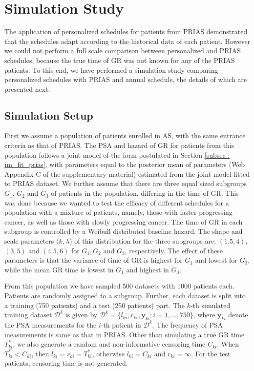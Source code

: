 \section{Simulation Study}
\label{sec: simulation_study}
The application of personalized schedules for patients from PRIAS demonstrated that the schedules adapt according to the historical data of each patient. However we could not perform a full scale comparison between personalized and PRIAS schedules, because the true time of GR was not known for any of the PRIAS patients. To this end, we have performed a simulation study comparing personalized schedules with PRIAS and annual schedule, the details of which are presented next.

\subsection{Simulation Setup}
\label{subsec : simulation_setup}
First we assume a population of patients enrolled in AS, with the same entrance criteria as that of PRIAS. The PSA and hazard of GR for patients from this population follows a joint model of the form postulated in Section \ref{subsec : jm_fit_prias}, with parameters equal to the posterior mean of parameters (Web Appendix C of the supplementary material) estimated from the joint model fitted to PRIAS dataset. We further assume that there are three equal sized subgroups $G_1$, $G_2$ and $G_3$ of patients in the population, differing in the time of GR. This was done because we wanted to test the efficacy of different schedules for a population with a mixture of patients, namely, those with faster progressing cancer, as well as those with slowly progressing cancer. The time of GR in each subgroup is controlled by a Weibull distributed baseline hazard. The shape and scale parameters $(k, \lambda$) of this distribution for the three subgroups are: $(1.5, 4)$, $(3, 5)$ and $(4.5, 6)$ for $G_1, G_2$ and $G_3$, respectively. The effect of these parameters is that the variance of time of GR is highest for $G_1$ and lowest for $G_3$, while the mean GR time is lowest in $G_1$ and highest in $G_3$.

From this population we have sampled 500 datasets with 1000 patients each. Patients are randomly assigned to a subgroup. Further, each dataset is split into a training (750 patients) and a test (250 patients) part. The $k$-th simulated training dataset $\mathcal{D}^k$ is given by $\mathcal{D}^k = \{l_{ki}, r_{ki}, \boldsymbol{y}_{ki}; i = 1, \ldots, 750\}$, where $\boldsymbol{y}_{ki}$ denote the PSA measurements for the $i$-th patient in $\mathcal{D}^k$. The frequency of PSA measurements is same as that in PRIAS. Other than simulating a true GR time $T^*_{ki}$, we also generate a random and non-informative censoring time $C_{ki}$. When $T^*_{ki} < C_{ki}$, then $l_{ki} = r_{ki} = T^*_{ki}$, otherwise $l_{ki} = C_{ki}$ and $r_{ki} = \infty$. For the test patients, censoring time is not generated.

